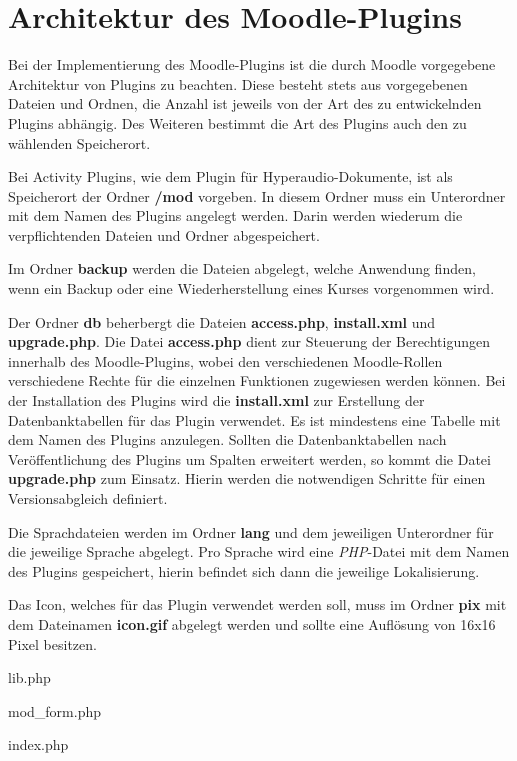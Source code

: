 \section{Architektur des Moodle-Plugins}
Bei der Implementierung des Moodle-Plugins ist die durch Moodle vorgegebene Architektur von Plugins zu beachten. Diese besteht stets aus vorgegebenen Dateien und Ordnen, die Anzahl ist jeweils von der Art des zu entwickelnden Plugins abhängig. Des Weiteren bestimmt die Art des Plugins auch den zu wählenden Speicherort.

Bei Activity Plugins, wie dem Plugin für Hyperaudio-Dokumente, ist als Speicherort der Ordner \textbf{/mod} vorgeben. In diesem Ordner muss ein Unterordner mit dem Namen des Plugins angelegt werden. Darin werden wiederum die verpflichtenden Dateien und Ordner abgespeichert.

Im Ordner \textbf{backup} werden die Dateien abgelegt, welche Anwendung finden, wenn ein Backup oder eine Wiederherstellung eines Kurses vorgenommen wird.

Der Ordner \textbf{db} beherbergt die Dateien \textbf{access.php}, \textbf{install.xml} und \textbf{upgrade.php}. Die Datei \textbf{access.php} dient zur Steuerung der Berechtigungen innerhalb des Moodle-Plugins, wobei den verschiedenen Moodle-Rollen verschiedene Rechte für die einzelnen Funktionen zugewiesen werden können. Bei der Installation des Plugins wird die \textbf{install.xml} zur Erstellung der Datenbanktabellen für das Plugin verwendet. Es ist mindestens eine Tabelle mit dem Namen des Plugins anzulegen. Sollten die Datenbanktabellen nach Veröffentlichung des Plugins um Spalten erweitert werden, so kommt die Datei \textbf{upgrade.php} zum Einsatz. Hierin werden die notwendigen Schritte für einen Versionsabgleich definiert.

Die Sprachdateien werden im Ordner \textbf{lang} und dem jeweiligen Unterordner für die jeweilige Sprache abgelegt. Pro Sprache wird eine \textit{PHP}-Datei mit dem Namen des Plugins gespeichert, hierin befindet sich dann die jeweilige Lokalisierung.

Das Icon, welches für das Plugin  verwendet werden soll, muss im Ordner \textbf{pix} mit dem Dateinamen \textbf{icon.gif} abgelegt werden und sollte eine Auflösung von 16x16 Pixel besitzen.

lib.php

mod\_form.php

index.php

